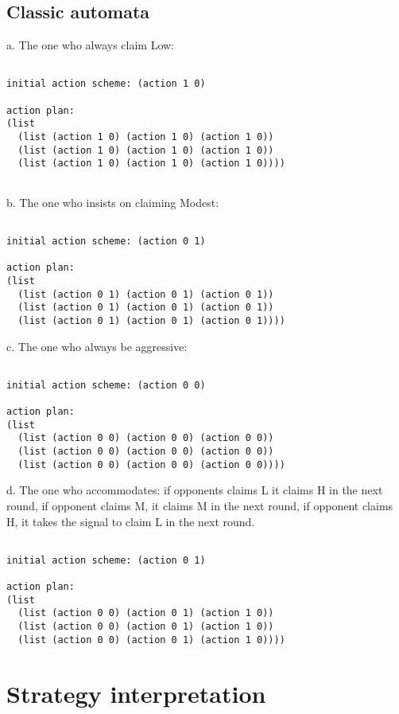 \documentclass[12.5pt]{report}
\begin{document}
\subsection{Classic automata}

a. The one who always claim Low:

\begin{verbatim}

initial action scheme: (action 1 0)

action plan:
(list
  (list (action 1 0) (action 1 0) (action 1 0))
  (list (action 1 0) (action 1 0) (action 1 0))
  (list (action 1 0) (action 1 0) (action 1 0))))


\end{verbatim}

b. The one who insists on claiming Modest:
\begin{verbatim}

initial action scheme: (action 0 1)

action plan:
(list
  (list (action 0 1) (action 0 1) (action 0 1))
  (list (action 0 1) (action 0 1) (action 0 1))
  (list (action 0 1) (action 0 1) (action 0 1))))

\end{verbatim}

c. The one who always be aggressive:

\begin{verbatim}

initial action scheme: (action 0 0)

action plan:
(list
  (list (action 0 0) (action 0 0) (action 0 0))
  (list (action 0 0) (action 0 0) (action 0 0))
  (list (action 0 0) (action 0 0) (action 0 0))))
\end{verbatim}

d. The one who accommodates: if opponents claims L it claims H in the next round, if opponent claims M, it claims M in the next round, if opponent claims H, it takes the signal to claim L in the next round.

\begin{verbatim}

initial action scheme: (action 0 1)

action plan:
(list
  (list (action 0 0) (action 0 1) (action 1 0))
  (list (action 0 0) (action 0 1) (action 1 0))
  (list (action 0 0) (action 0 1) (action 1 0))))

\end{verbatim}

\section{Strategy interpretation}
\end{document}
